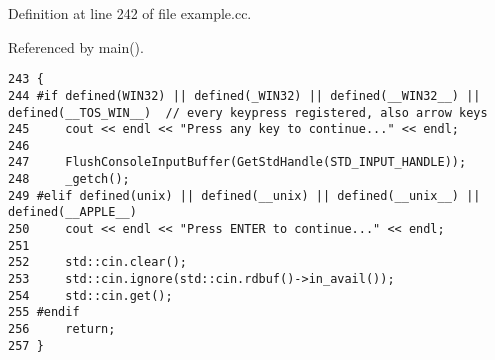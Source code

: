 Definition at line 242 of file example.cc.

Referenced by main().

\begin{Code}\begin{verbatim}243 {
244 #if defined(WIN32) || defined(_WIN32) || defined(__WIN32__) || defined(__TOS_WIN__)  // every keypress registered, also arrow keys
245     cout << endl << "Press any key to continue..." << endl;
246 
247     FlushConsoleInputBuffer(GetStdHandle(STD_INPUT_HANDLE));
248     _getch();
249 #elif defined(unix) || defined(__unix) || defined(__unix__) || defined(__APPLE__)
250     cout << endl << "Press ENTER to continue..." << endl;
251 
252     std::cin.clear();
253     std::cin.ignore(std::cin.rdbuf()->in_avail());
254     std::cin.get();
255 #endif
256     return;
257 }
\end{verbatim}
\end{Code}


